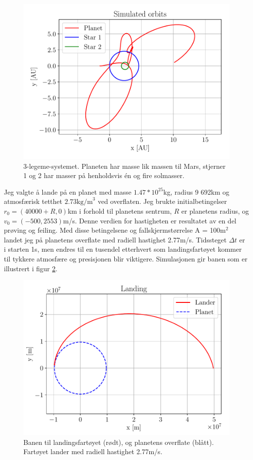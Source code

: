 \documentclass[reprint,english,notitlepage]{revtex4-1}  %
\begin{document}
 \begin{figure}
   \includegraphics[width=\linewidth]{output/plots/threebody.pdf}
   \caption{3-legeme-systemet. Planeten har masse lik massen til Mars, stjerner 1 og 2 har masser på henholdsvis én og fire solmasser.}
   \label{fig:threebody}
 \end{figure}

Jeg valgte å lande på en planet med masse $1.47 * 10^{25}$kg, radius 9 692km og atmosfærisk
 tetthet $2.73 \text{kg/m}^3$ ved overflaten. Jeg brukte initialbetingelser $r_0 = (40 000 + R, 0)$km i forhold til planetens sentrum, $R$ er planetens radius, og $v_0 = (-500, 2553)$m/s. Denne verdien for hastigheten er resultatet av en del prøving og feiling. Med disse betingelsene og fallskjermstørrelse A = 100m$^2$ landet jeg på planetens overflate med radiell hastighet 2.77m/s. Tidssteget $\Delta t$ er i starten 1s, men endres til en tusendel etterhvert som landingsfartøyet kommer til tykkere atmosfære og presisjonen blir viktigere. Simulasjonen gir banen som er illustrert i figur \ref{fig:lander}.

 \begin{figure}
   \includegraphics[width=\linewidth]{output/plots/lander_precise.pdf}
   \caption{Banen til landingsfartøyet (rødt), og planetens overflate (blått). Fartøyet lander med radiell hastighet 2.77m/s.}
   \label{fig:lander}
 \end{figure}
\end{document}
